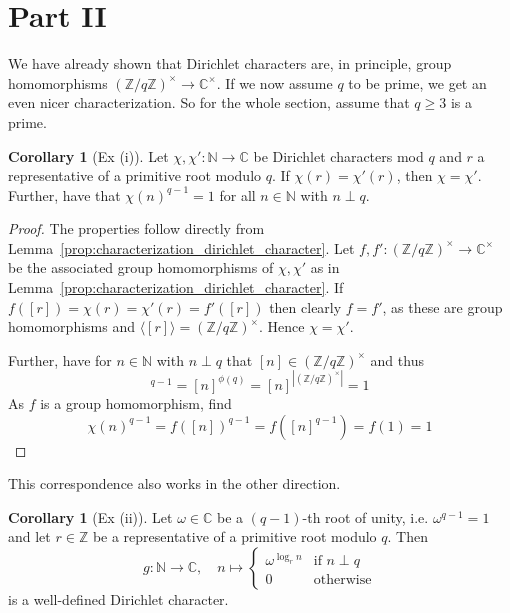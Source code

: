 \documentclass{scrartcl}
\newcommand{\N}{\mathbb{N}}
\newcommand{\Z}{\mathbb{Z}}
\newcommand{\C}{\mathbb{C}}
\newcommand{\units}{\times}
\theoremstyle{definition}
\newtheorem{corollary}[definition]{Corollary}
\begin{document}
\section{Part II}
We have already shown that Dirichlet characters are, in principle, group homomorphisms $(\Z/q\Z)^\units \to \C^\units$.
If we now assume $q$ to be prime, we get an even nicer characterization.
So for the whole section, assume that $q \geq 3$ is a prime.
\begin{corollary}[Ex (i)]
    \label{prop:dirichlet_character_image_group}
    Let $\chi, \chi': \N \to \C$ be Dirichlet characters mod $q$ and $r$ a representative of a primitive root modulo $q$.
    If $\chi(r) = \chi'(r)$, then $\chi = \chi'$.
    Further, have that $\chi(n)^{q - 1} = 1$ for all $n \in \N$ with $n \perp q$.
\end{corollary}
\begin{proof}
    The properties follow directly from Lemma~\ref{prop:characterization_dirichlet_character}.
    Let $f, f': (\Z/q\Z)^\units \to \C^\units$ be the associated group homomorphisms of $\chi, \chi'$ as in Lemma~\ref{prop:characterization_dirichlet_character}.
    If $f([r]) = \chi(r) = \chi'(r) = f'([r])$ then clearly $f = f'$, as these are group homomorphisms and $\langle [r] \rangle = (\Z/q\Z)^\units$.
    Hence $\chi = \chi'$.

    Further, have for $n \in \N$ with $n \perp q$ that $[n] \in (\Z/q\Z)^\units$ and thus
    \begin{equation*}
        [n]^{q - 1} = [n]^{\phi(q)} = [n]^{|(\Z/q\Z)^\units|} = 1 
    \end{equation*}
    As $f$ is a group homomorphism, find
    \begin{equation*}
        \chi(n)^{q - 1} = f([n])^{q - 1} = f([n]^{q - 1}) = f(1) = 1
    \end{equation*}
\end{proof}
This correspondence also works in the other direction.
\begin{corollary}[Ex (ii)]
    \label{prop:dirichlet_character_primitive_root}
    Let $\omega \in \C$ be a $(q - 1)$-th root of unity, i.e. $\omega^{q - 1} = 1$ and let $r \in \Z$ be a representative of a primitive root modulo $q$.
    Then
    \begin{equation*}
        g: \N \to \C, \quad n \mapsto \begin{cases}
            \omega^{\log_r n} & \text{if $n \perp q$} \\
            0 & \text{otherwise}
        \end{cases}
    \end{equation*}
    is a well-defined Dirichlet character.
\end{corollary}
\end{document}
